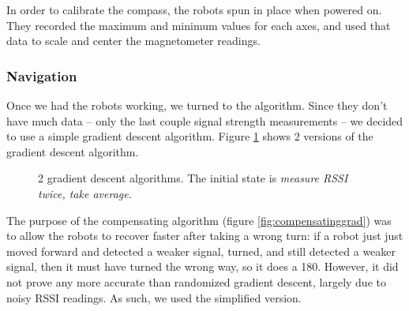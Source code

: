 \documentclass[]{article}
\begin{document}
In order to calibrate the compass, the robots spun in place when powered
on. They recorded the maximum and minimum values for each axes, and used
that data to scale and center the magnetometer readings.

\subsubsection{Navigation}

Once we had the robots working, we turned to the algorithm.
Since they don't have much data -- only the last couple signal strength measurements --
we decided to use a simple gradient descent algorithm.
Figure \ref{fig:graddesc} shows 2 versions of the gradient descent algorithm.

\begin{figure}
  \centering
  \caption{2 gradient descent algorithms. The initial state is \emph{measure RSSI twice, take average}.}
  \label{fig:graddesc}
\end{figure}

The purpose of the compensating algorithm (figure \ref{fig:compensatinggrad}) was to allow the robots to recover faster after taking a wrong turn: if a robot just just moved forward and detected a weaker signal, turned, and still detected a weaker signal, then it must have turned the wrong way, so it does a 180.
However, it did not prove any more accurate than randomized gradient descent, largely due to noisy RSSI readings.
As such, we used the simplified version.
\end{document}

